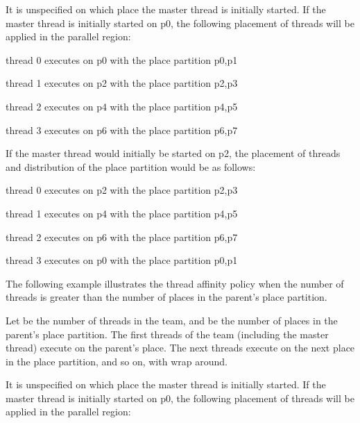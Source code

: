 It is unspecified on which place the master thread is initially started. If the 
master thread is initially started on p0, the following placement of threads will 
be applied in the parallel region:

\begin{compactitem}
\item thread 0 executes on p0 with the place partition p0,p1

\item thread 1 executes on p2 with the place partition p2,p3

\item thread 2 executes on p4 with the place partition p4,p5

\item thread 3 executes on p6 with the place partition p6,p7
\end{compactitem}


If the master thread would initially be started on p2, the placement of threads 
and distribution of the place partition would be as follows:

\begin{compactitem}
\item thread 0 executes on p2 with the place partition p2,p3

\item thread 1 executes on p4 with the place partition p4,p5

\item thread 2 executes on p6 with the place partition p6,p7

\item thread 3 executes on p0 with the place partition p0,p1
\end{compactitem}

The following example illustrates the  thread affinity policy when 
the number of threads is greater than the number of places in the parent's place 
partition.

Let  be the number of threads in the team, and  be the number of places in the 
parent's place partition. The first  threads of the team (including the master 
thread) execute on the parent's place. The next  threads execute on the next 
place in the place partition, and so on, with wrap around. 



It is unspecified on which place the master thread is initially started. If the 
master thread is initially started on p0, the following placement of threads will 
be applied in the parallel region:

